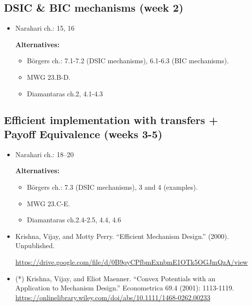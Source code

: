 \documentclass{article}
\begin{document}
\subsection{DSIC \& BIC mechanisms (week 2)}
\begin{itemize}
	\item Narahari ch.: 15, 16
	
	\textbf{Alternatives:}
	\begin{itemize}
		\item B{\"o}rgers ch.: 7.1-7.2 (DSIC mechanisms), 6.1-6.3 (BIC mechanisms).%
		\item MWG 23.B-D.
		\item Diamantaras ch.2, 4.1-4.3
	\end{itemize}
\end{itemize}

\subsection{Efficient implementation with transfers + Payoff Equivalence (weeks 3-5)}
\begin{itemize}
	\item Narahari ch.: 18--20
	
	\textbf{Alternatives:}
	\begin{itemize}
		\item B{\"o}rgers ch.: 7.3 (DSIC mechanisms), 3 and 4 (examples).
		\item MWG 23.C-E.
		\item Diamantaras ch.2.4-2.5, 4.4, 4.6
	\end{itemize}
	\item Krishna, Vijay, and Motty Perry. ``Efficient Mechanism Design.'' (2000). Unpublished.
	
	\url{https://drive.google.com/file/d/0B9qyCPfbmExnbmE1OTk5OGJmQzA/view}
	
	\item (*) Krishna, Vijay, and Eliot Maenner. ``Convex Potentials with an Application to Mechanism Design.'' Econometrica 69.4 (2001): 1113-1119.\\
	\url{https://onlinelibrary.wiley.com/doi/abs/10.1111/1468-0262.00233}
\end{itemize}
\end{document}
